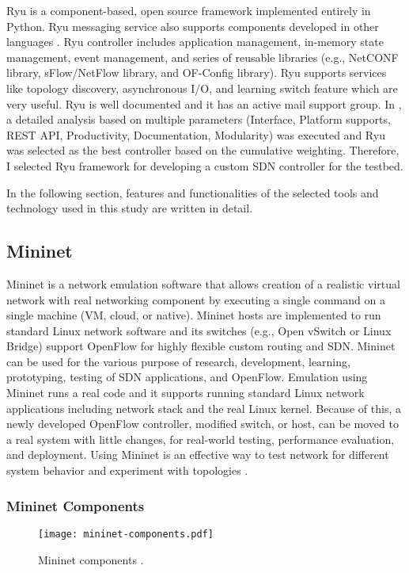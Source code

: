 Ryu is a component-based, open source framework implemented entirely in Python. Ryu messaging service also supports components developed in other languages \cite{ryu}. Ryu controller includes application management, in-memory state management, event management, and series of reusable libraries (e.g., NetCONF library, sFlow/NetFlow library, and OF-Config library). Ryu supports services like topology discovery, asynchronous I/O, and learning switch feature which are very useful. Ryu is well documented and it has an active mail support group. In \cite{6916572}, a detailed analysis based on multiple parameters (Interface, Platform supports, REST API, Productivity, Documentation, Modularity) was executed and Ryu was selected as the best controller based on the cumulative weighting. Therefore, I selected Ryu framework for developing a custom SDN controller for the testbed.

In the following section, features and functionalities of the selected tools and technology used in this study are written in detail.

\subsection{Mininet}\label{sec:mininet}
Mininet is a network emulation software that allows creation of a realistic virtual network with real networking component by executing a single command on a single machine (VM, cloud, or native). Mininet hosts are implemented to run standard Linux network software and its switches (e.g., Open vSwitch or Linux Bridge) support OpenFlow for highly flexible custom routing and SDN. Mininet can be used for the various purpose of research, development, learning, prototyping, testing of SDN applications, and OpenFlow. Emulation using Mininet runs a real code and it supports running standard Linux network applications including network stack and the real Linux kernel. Because of this, a newly developed OpenFlow controller, modified switch, or host, can be moved to a real system with little changes, for real-world testing, performance evaluation, and deployment. Using Mininet is an effective way to test network for different system behavior and experiment with topologies \cite{min-over}.

\subsubsection{Mininet Components}

\begin{figure}[H]
\begin{center}
	\resizebox{\textwidth}{!}
	{\texttt{[image: mininet-components.pdf]}}
	\caption{Mininet components \cite{Lantz:2010:NLR:1868447.1868466}.}
	\label{fig:mincomponent}
\end{center}
\end{figure}

